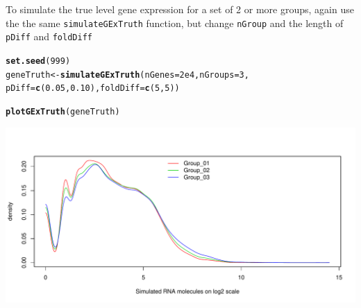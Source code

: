 \documentclass{article}\usepackage[]{graphicx}\usepackage[usenames,dvipsnames]{color}
\makeatletter
\def\maxwidth{ %
  \ifdim\Gin@nat@width>\linewidth
    \linewidth
  \else
    \Gin@nat@width
  \fi
}
\newcommand{\hlnum}[1]{\textcolor[rgb]{0.686,0.059,0.569}{#1}}%
\newcommand{\hlstd}[1]{\textcolor[rgb]{0.345,0.345,0.345}{#1}}%
\newcommand{\hlkwb}[1]{\textcolor[rgb]{0.69,0.353,0.396}{#1}}%
\newcommand{\hlkwc}[1]{\textcolor[rgb]{0.333,0.667,0.333}{#1}}%
\newcommand{\hlkwd}[1]{\textcolor[rgb]{0.737,0.353,0.396}{\textbf{#1}}}%
\newenvironment{kframe}{%
 \def\at@end@of@kframe{}%
 \ifinner\ifhmode%
  \def\at@end@of@kframe{\end{minipage}}%
  \begin{minipage}{\columnwidth}%
 \fi\fi%
 \def\FrameCommand##1{\hskip\@totalleftmargin \hskip-\fboxsep
 \colorbox{shadecolor}{##1}\hskip-\fboxsep
     \hskip-\linewidth \hskip-\@totalleftmargin \hskip\columnwidth}%
 \MakeFramed {\advance\hsize-\width
   \@totalleftmargin\z@ \linewidth\hsize
   \@setminipage}}%
 {\par\unskip\endMakeFramed%
 \at@end@of@kframe}
\newenvironment{knitrout}{}{} %
\makeatother
\begin{document}
To simulate the true level gene expression for a set of 2 or more groups, 
again use the the same \texttt{simulateGExTruth} function, but change 
\texttt{nGroup} and the length of \texttt{pDiff} and \texttt{foldDiff} 
\begin{knitrout}
\color{fgcolor}\begin{kframe}
\begin{alltt}
\hlkwd{set.seed}\hlstd{(}\hlnum{999}\hlstd{)}
\hlstd{geneTruth} \hlkwb{<-} \hlkwd{simulateGExTruth}\hlstd{(}\hlkwc{nGenes} \hlstd{=} \hlnum{2e4}\hlstd{,} \hlkwc{nGroups} \hlstd{=} \hlnum{3}\hlstd{,}
                              \hlkwc{pDiff} \hlstd{=} \hlkwd{c}\hlstd{(}\hlnum{0.05}\hlstd{,} \hlnum{0.10}\hlstd{),} \hlkwc{foldDiff} \hlstd{=} \hlkwd{c}\hlstd{(}\hlnum{5}\hlstd{,}\hlnum{5}\hlstd{))}
\end{alltt}


{\ttfamily\noindent\itshape\color{messagecolor}{\#\# [quantroSim]: Simulating RNA transcript counts using a Poisson \\\#\#\ \ \ \ \ \ \ \ \ \  distribution with mean parameters from 0.01 to 4662.66}}\begin{alltt}
\hlkwd{plotGExTruth}\hlstd{(geneTruth)}
\end{alltt}
\end{kframe}
\includegraphics[width=\maxwidth]{figure/geneTruth-Fig-3groups-1} 

\end{knitrout}
\end{document}
